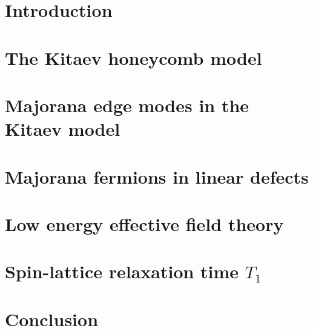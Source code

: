 \documentclass[12pt]{report}
\numberwithin{equation}{section}
\renewcommand{\baselinestretch}{1.2} %
\begin{document}
\clearpage
\printglossary
\setlength{\parindent}{2em}
\renewcommand{\baselinestretch}{1.35} 


\chapter{Introduction}


\chapter{The Kitaev honeycomb model}


\chapter{Majorana edge modes in the Kitaev model}


\chapter{Majorana fermions %
in linear defects}


\chapter{Low energy effective field theory}


\chapter[Spin-lattice relaxation rate]{Spin-lattice relaxation time $T_1$}


\chapter{Conclusion}


%



\end{document}

